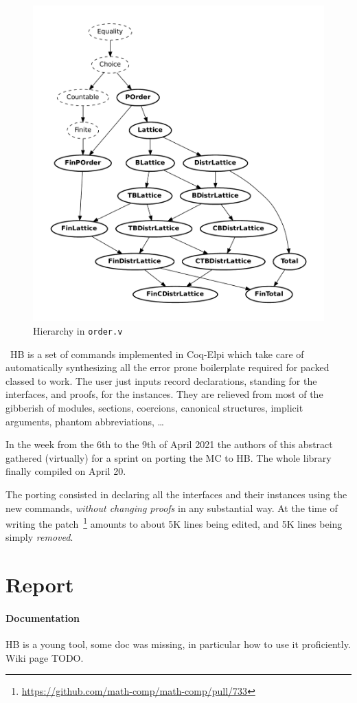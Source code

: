 \documentclass{easychair}
\def\MC{{\sf MC}}
\def\HB{{\sf HB}}
\begin{document}
\begin{figure}
  \vspace{-2em}
	\includegraphics[width=.40\textwidth]{order.pdf}
  \caption{\small Hierarchy in {\tt order.v}}
	\label{fig:order}
  \vspace{-3em}
\end{figure}
\
\HB{} is a set of commands implemented in Coq-Elpi which take
care of automatically synthesizing all the error prone boilerplate required for
packed classed to work. The user just inputs record declarations,
standing for the interfaces, and proofs, for the instances.
They are relieved from
most of the gibberish of modules, sections, coercions, canonical
structures, implicit arguments, phantom abbreviations, \ldots

In the week from the 6th to the 9th of April 2021 the authors of this abstract
gathered (virtually) for a sprint on porting the \MC{} to
\HB{}. The whole library finally compiled on April 20.

The porting consisted in declaring all the interfaces and their instances
using the new commands, \emph{without changing proofs} in any substantial way.
At the time of writing the patch~\footnote{\url{https://github.com/math-comp/math-comp/pull/733}}
amounts to about 5K lines being edited, and 5K lines being simply \emph{removed}.\\

\section{Report}

\paragraph{Documentation}

\HB{} is a young tool, some doc was missing, in particular how to use it
proficiently. Wiki page TODO.
\end{document}
